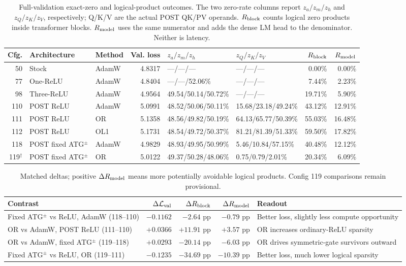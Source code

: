 \documentclass[10pt]{article}
\newcommand{\pct}{\%}
\newcommand{\Rblock}{R_{\rm block}}
\newcommand{\Rmodel}{R_{\rm model}}
\begin{document}
\begin{table}[H]
\centering
\caption{Full-validation exact-zero and logical-product outcomes. The two zero-rate columns report $z_a/z_m/z_h$ and $z_Q/z_K/z_V$, respectively; Q/K/V are the actual POST QK/PV operands. $\Rblock$ counts logical zero products inside transformer blocks. $\Rmodel$ uses the same numerator and adds the dense LM head to the denominator. Neither is latency.}
\label{tab:zeros}
\scriptsize
\setlength{\tabcolsep}{4.5pt}
\begin{tabular}{rllrllrr}
\toprule
Cfg. & Architecture & Method & Val. loss & $z_a/z_m/z_h$ & $z_Q/z_K/z_V$ & $\Rblock$ & $\Rmodel$ \\
\midrule
50  & Stock & AdamW & 4.8317 & ---/---/--- & ---/---/--- & 0.00\pct{} & 0.00\pct{} \\
77  & One-ReLU & AdamW & 4.8404 & ---/---/52.06\pct{} & ---/---/--- & 7.44\pct{} & 2.23\pct{} \\
98  & Three-ReLU & AdamW & 4.9564 & 49.54/50.14/50.72\pct{} & ---/---/--- & 19.71\pct{} & 5.90\pct{} \\
110 & POST ReLU & AdamW & 5.0991 & 48.52/50.06/50.11\pct{} & 15.68/23.18/49.24\pct{} & 43.12\pct{} & 12.91\pct{} \\
111 & POST ReLU & OR & 5.1358 & 48.56/49.82/50.19\pct{} & 64.13/65.77/50.39\pct{} & 55.03\pct{} & 16.48\pct{} \\
112 & POST ReLU & OL1 & 5.1731 & 48.54/49.72/50.37\pct{} & 81.21/81.39/51.33\pct{} & 59.50\pct{} & 17.82\pct{} \\
118 & POST fixed ATG$^{\pm}$ & AdamW & 4.9829 & 48.93/49.95/50.99\pct{} & 5.46/10.84/57.15\pct{} & 40.48\pct{} & 12.12\pct{} \\
119$^{\dagger}$ & POST fixed ATG$^{\pm}$ & OR & 5.0122 & 49.37/50.28/48.06\pct{} & 0.75/0.79/2.01\pct{} & 20.34\pct{} & 6.09\pct{} \\
\bottomrule
\end{tabular}
\end{table}

\begin{table}[H]
\centering
\caption{Matched deltas; positive $\Delta\Rmodel$ means more potentially avoidable logical products. Config 119 comparisons remain provisional.}
\label{tab:deltas}
\small
\setlength{\tabcolsep}{5.0pt}
\begin{tabularx}{\textwidth}{XrrrX}
\toprule
Contrast & $\Delta\mathcal{L}_{\rm val}$ & $\Delta\Rblock$ & $\Delta\Rmodel$ & Readout \\
\midrule
Fixed ATG$^{\pm}$ vs ReLU, AdamW (118--110) & $-0.1162$ & $-2.64$ pp & $-0.79$ pp & Better loss, slightly less compute opportunity \\
OR vs AdamW, POST ReLU (111--110) & $+0.0366$ & $+11.91$ pp & $+3.57$ pp & OR increases ordinary-ReLU sparsity \\
OR vs AdamW, fixed ATG$^{\pm}$ (119--118) & $+0.0293$ & $-20.14$ pp & $-6.03$ pp & OR drives symmetric-gate survivors outward \\
Fixed ATG$^{\pm}$ vs ReLU, OR (119--111) & $-0.1235$ & $-34.69$ pp & $-10.39$ pp & Better loss, much lower logical sparsity \\
\bottomrule
\end{tabularx}
\end{table}
\end{document}
